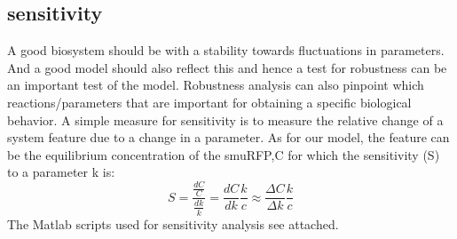 \subsection{sensitivity }
A good biosystem should be with a stability towards fluctuations in parameters. And  a  good model should also reflect this and hence a test for robustness can be an important test of the model.
Robustness analysis can also pinpoint which reactions/parameters that are important for obtaining a specific biological behavior. A simple measure for sensitivity is to measure the relative change of a system feature due to a change in a parameter. As for our model, the feature can be the equilibrium concentration of the smuRFP,C for which the sensitivity (S) to a parameter k is:
\begin{equation}
S=\frac{\frac{dC}{C}}{\frac{dk}{k}}=\frac{dC}{dk}\frac{k}{c}\approx \frac{\Delta C}{\Delta k}\frac{k}{c}
\end{equation}
The Matlab scripts used for sensitivity analysis see attached.
